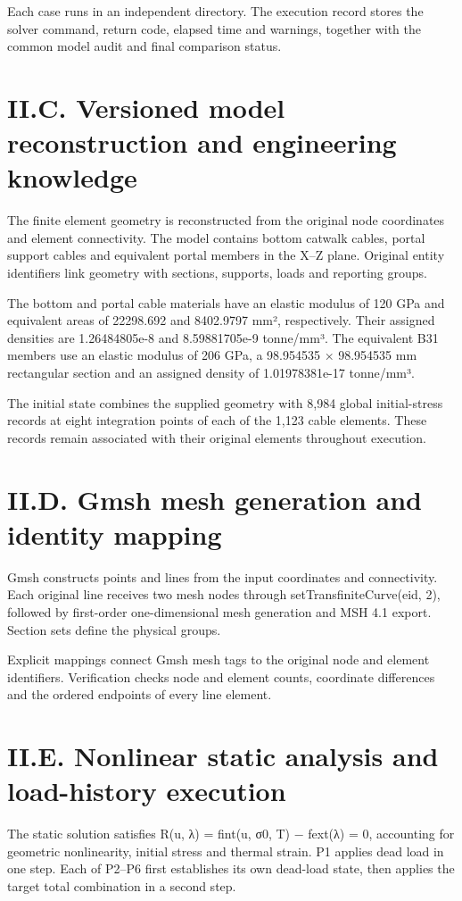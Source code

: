 \documentclass[11pt]{article}
\begin{document}
Each case runs in an independent directory. The execution record stores the solver command, return code, elapsed time and warnings, together with the common model audit and final comparison status.

\section*{II.C. Versioned model reconstruction and engineering knowledge}
The finite element geometry is reconstructed from the original node coordinates and element connectivity. The model contains bottom catwalk cables, portal support cables and equivalent portal members in the X–Z plane. Original entity identifiers link geometry with sections, supports, loads and reporting groups.

The bottom and portal cable materials have an elastic modulus of 120 GPa and equivalent areas of 22298.692 and 8402.9797 mm², respectively. Their assigned densities are 1.26484805e-8 and 8.59881705e-9 tonne/mm³. The equivalent B31 members use an elastic modulus of 206 GPa, a 98.954535 × 98.954535 mm rectangular section and an assigned density of 1.01978381e-17 tonne/mm³.

The initial state combines the supplied geometry with 8,984 global initial-stress records at eight integration points of each of the 1,123 cable elements. These records remain associated with their original elements throughout execution.

\section*{II.D. Gmsh mesh generation and identity mapping}
Gmsh constructs points and lines from the input coordinates and connectivity. Each original line receives two mesh nodes through setTransfiniteCurve(eid, 2), followed by first-order one-dimensional mesh generation and MSH 4.1 export. Section sets define the physical groups.

Explicit mappings connect Gmsh mesh tags to the original node and element identifiers. Verification checks node and element counts, coordinate differences and the ordered endpoints of every line element.

\section*{II.E. Nonlinear static analysis and load-history execution}
The static solution satisfies R(u, λ) = fint(u, σ0, T) − fext(λ) = 0, accounting for geometric nonlinearity, initial stress and thermal strain. P1 applies dead load in one step. Each of P2–P6 first establishes its own dead-load state, then applies the target total combination in a second step.
\end{document}
